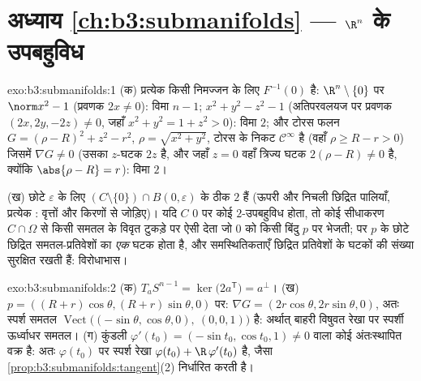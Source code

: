 \section*{अध्याय \ref{ch:b3:submanifolds} --- $\R^n$ के
उपबहुविध}

\begin{solution}{exo:b3:submanifolds:1}
(क) प्रत्येक किसी निमज्जन के लिए $F^{-1}(0)$ है: $\R^n\setminus\{0\}$ पर $\norm x^2 - 1$ (प्रवणक $2x \neq 0$):
विमा $n-1$; $x^2 + y^2 - z^2 - 1$ (अतिपरवलयज पर प्रवणक $(2x, 2y, -2z) \neq 0$, जहाँ $x^2 + y^2 = 1 + z^2 > 0$): विमा $2$; और
टोरस फलन $G = (\rho - R)^2 + z^2 - r^2$, $\rho =
\sqrt{x^2+y^2}$, टोरस के निकट $\mathcal C^\infty$ है (वहाँ $\rho
\geq R - r > 0$) जिसमें $\nabla G \neq 0$
(उसका $z$-घटक $2z$ है, और जहाँ $z = 0$ वहाँ त्रिज्य घटक $2(\rho - R)\ne0$ है, क्योंकि
$\abs{\rho - R} = r$): विमा $2$।

(ख) छोटे $\varepsilon$ के लिए $(C\setminus\{0\})\cap B(0,\varepsilon)$ के ठीक $2$  हैं (ऊपरी और निचली
छिद्रित पालियाँ, प्रत्येक : वृत्तों और किरणों से जोड़िए)।
यदि $C$ $0$ पर कोई $2$-उपबहुविध होता, तो कोई सीधाकरण $C\cap\Omega$ से किसी
समतल के विवृत टुकड़े पर ऐसी  देता जो $0$ को किसी बिंदु
$p$ पर भेजती; पर $p$ के छोटे छिद्रित समतल-प्रतिवेशों का \emph{एक}
घटक होता है, और समस्थितिकताएँ छिद्रित प्रतिवेशों के घटकों की संख्या
सुरक्षित रखती हैं: विरोधाभास।
\end{solution}

\begin{solution}{exo:b3:submanifolds:2}
(क) $T_aS^{n-1} = \ker\bigl(2a^{\mathsf T}\bigr) = a^\perp$।
(ख) $p = ((R+r)\cos\theta, (R+r)\sin\theta, 0)$ पर: $\nabla G
= (2r\cos\theta, 2r\sin\theta, 0)$, अतः स्पर्श समतल $\operatorname{Vect}\bigl((-\sin\theta, \cos\theta, 0),\ (0,
0, 1)\bigr)$ है: अर्थात् बाहरी विषुवत
रेखा पर स्पर्शी ऊर्ध्वाधर समतल।
(ग) कुंडली $\varphi'(t_0) =
(-\sin t_0, \cos t_0, 1) \neq 0$ वाला कोई अंतःस्थापित वक्र है: अतः $\varphi(t_0)$ पर स्पर्श रेखा
$\varphi(t_0) + \R\,\varphi'(t_0)$ है, जैसा \cref{prop:b3:submanifolds:tangent}(2) निर्धारित करती है।
\end{solution}

